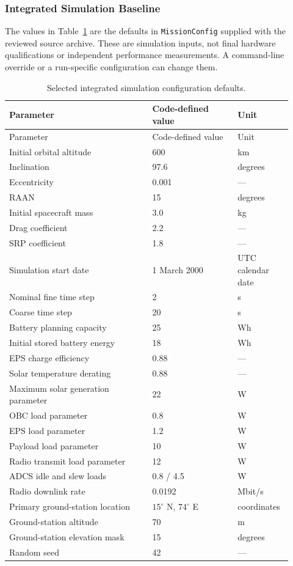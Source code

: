 \subsubsection{Integrated Simulation Baseline}
\label{app:integrated-sim-baseline}
The values in Table~\ref{tab:science-model-defaults} are the defaults in \texttt{MissionConfig} supplied with the reviewed source archive. These are simulation inputs, not final hardware qualifications or independent performance measurements. A command-line override or a run-specific configuration can change them.

\begin{longtable}{p{0.47\linewidth}p{0.29\linewidth}p{0.16\linewidth}}
\caption{Selected integrated simulation configuration defaults.}\label{tab:science-model-defaults}\\
\toprule Parameter & Code-defined value & Unit \\
\midrule
\endfirsthead
\toprule Parameter & Code-defined value & Unit \\
\midrule
\endhead
Initial orbital altitude & 600 & km \\
Inclination & 97.6 & degrees \\
Eccentricity & 0.001 & --- \\
RAAN & 15 & degrees \\
Initial spacecraft mass & 3.0 & kg \\
Drag coefficient & 2.2 & --- \\
SRP coefficient & 1.8 & --- \\
Simulation start date & 1 March 2000 & UTC calendar date \\
Nominal fine time step & 2 & s \\
Coarse time step & 20 & s \\
Battery planning capacity & 25 & Wh \\
Initial stored battery energy & 18 & Wh \\
EPS charge efficiency & 0.88 & --- \\
Solar temperature derating & 0.88 & --- \\
Maximum solar generation parameter & 22 & W \\
OBC load parameter & 0.8 & W \\
EPS load parameter & 1.2 & W \\
Payload load parameter & 10 & W \\
Radio transmit load parameter & 12 & W \\
ADCS idle and slew loads & 0.8 / 4.5 & W \\
Radio downlink rate & 0.0192 & Mbit/s \\
Primary ground-station location & $15^\circ$ N, $74^\circ$ E & coordinates \\
Ground-station altitude & 70 & m \\
Ground-station elevation mask & 15 & degrees \\
Random seed & 42 & --- \\
\bottomrule
\end{longtable}


